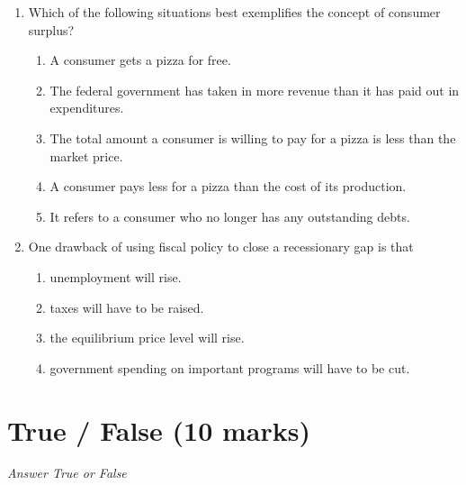 \documentclass[12pt]{article}
\begin{document}
\begin{enumerate}[label=\arabic*.]
\begin{enumerate}[label=(\alph*)]
\end{enumerate}
\item Which of the following situations best exemplifies the concept of consumer surplus?
\begin{enumerate}[label=(\alph*)]
    \item A consumer gets a pizza for free.
    \item The federal government has taken in more revenue than it has paid out in expenditures.
    \item The total amount a consumer is willing to pay for a pizza is less than the market price.
    \item A consumer pays less for a pizza than the cost of its production.
    \item It refers to a consumer who no longer has any outstanding debts.
\end{enumerate}
\item One drawback of using fiscal policy to close a recessionary gap is that
\begin{enumerate}[label=(\alph*)]
    \item unemployment will rise.
    \item taxes will have to be raised.
    \item the equilibrium price level will rise.
    \item government spending on important programs will have to be cut.
\end{enumerate}
\end{enumerate}

\section*{True / False (10 marks)}
\textit{Answer True or False}
\end{document}
